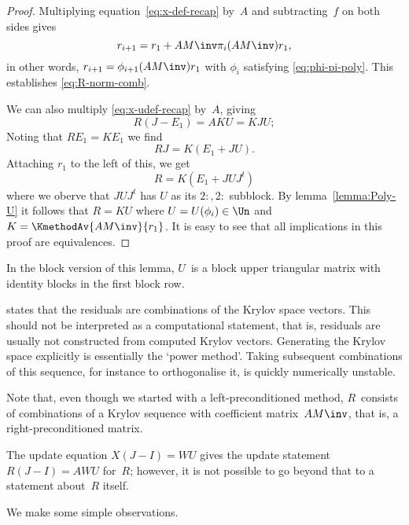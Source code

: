 \begin{precond}
\begin{proof}
Multiplying equation~\eqref{eq:x-def-recap}
by~$A$ and subtracting~$f$ on both sides gives
\[ r_{i+1}=r_1+AM\inv \pi_i(AM\inv)r_1, \]
in other words, $r_{i+1} = \phi_{i+1}(AM\inv)r_1$ with $\phi_i$
satisfying \eqref{eq:phi-pi-poly}. This establishes \eqref{eq:R-norm-comb}.

We can also multiply \eqref{eq:x-udef-recap} by~$A$, giving
\[ R(J-E_1) = AKU = KJU; \]
Noting that $RE_1=KE_1$ we find
\[ RJ = K(E_1+JU). \]
Attaching $r_1$ to the left of this, we get
\[ R=K(E_1+JUJ^t) \]
where we oberve that $JUJ^t$ has $U$ as its $2:,2:$ subblock.
%
By lemma~\ref{lemma:Poly-U} it follows that $R=KU$ where
$U=U(\phi_i)\in\Un$ and $K=\KmethodAv{AM\inv}{r_1}$.
It is easy to see that all implications in this proof are equivalences.
\end{proof}
\end{precond}

\begin{block}
In the block version of this lemma, $U$~is a  block upper triangular
matrix with identity blocks in the first block row.
\end{block}

\begin{remark}
 states that the residuals are combinations of
the Krylov space vectors. This should not be interpreted as a
computational statement, that is, residuals are usually not
constructed from computed Krylov vectors. Generating the Krylov space
explicitly is essentially the `power
method'. Taking subsequent combinations of this sequence, for instance to
orthogonalise it, is quickly numerically unstable.
\end{remark}

\begin{precond}
\begin{remark}\label{R=AM-Krylov}
Note that, even though we started with a left-preconditioned method,
$R$~consists of combinations of a Krylov sequence with coefficient
matrix~$AM\inv$, that is, a right-preconditioned matrix.
\end{remark}
\end{precond}

\begin{extended}
The update equation $X(J-I)=WU$ gives the update statement
$R(J-I)=AWU$ for~$R$; however, it is not
possible to go beyond that to a statement about~$R$ itself.
\end{extended}

We make some simple observations.

